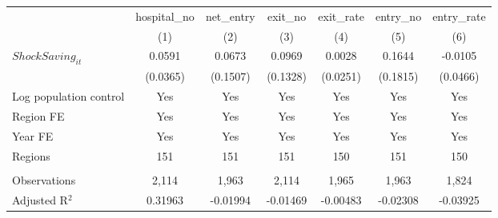 \begingroup
\centering
\begin{tabular}{lcccccc}
   \toprule
                          & hospital\_no  & net\_entry  & exit\_no  & exit\_rate  & entry\_no  & entry\_rate \\    
                          & (1)           & (2)         & (3)       & (4)         & (5)        & (6)\\  
   \midrule 
   $ShockSaving_{it}$     & 0.0591        & 0.0673      & 0.0969    & 0.0028      & 0.1644     & -0.0105\\   
                          & (0.0365)      & (0.1507)    & (0.1328)  & (0.0251)    & (0.1815)   & (0.0466)\\   
   Log population control & Yes           & Yes         & Yes       & Yes         & Yes        & Yes\\  
   Region FE              & Yes           & Yes         & Yes       & Yes         & Yes        & Yes\\  
   Year FE                & Yes           & Yes         & Yes       & Yes         & Yes        & Yes\\  
   Regions                & 151           & 151         & 151       & 150         & 151        & 150\\  
    \\
   Observations           & 2,114         & 1,963       & 2,114     & 1,965       & 1,963      & 1,824\\  
   Adjusted R$^2$         & 0.31963       & -0.01994    & -0.01469  & -0.00483    & -0.02308   & -0.03925\\  
   \bottomrule
\end{tabular}
\par\endgroup
